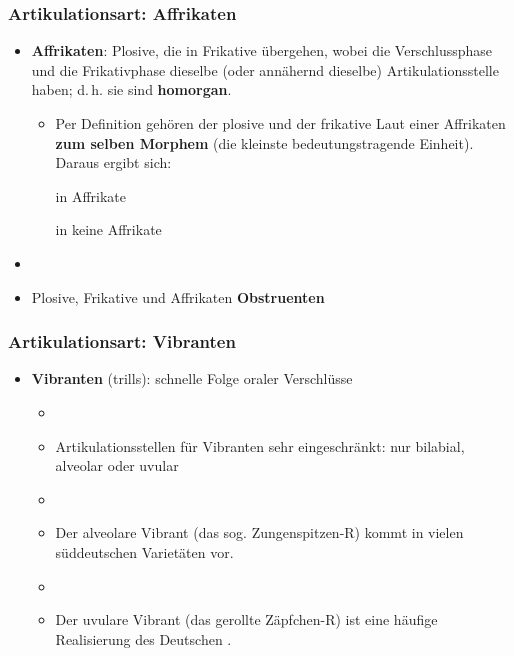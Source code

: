 \begin{frame}
\frametitle{Artikulationsart: Affrikaten}

		\begin{itemize}
			\item \textbf{Affrikaten}: Plosive, die in Frikative übergehen, wobei die Verschlussphase und die Frikativphase dieselbe (oder annähernd dieselbe) Artikulationsstelle haben; d.\,h. sie sind \textbf{homorgan}.

			\ea \textipa{[ \t{pf} , \t{ts} , \t{tS} , \t{dZ} ]}
			\z

			\begin{itemize}
				\item Per Definition gehören der plosive und der frikative Laut einer Affrikaten \textbf{zum selben Morphem} (die kleinste bedeutungstragende Einheit). Daraus ergibt sich:

				\ea \textipa{[ \t{ts} ]} in  \ras Affrikate
				\z
				
				\ea \textipa{[ ts ]} in  \ras keine Affrikate
				\z

			\end{itemize}
		
		\item[]
		\item Plosive, Frikative und Affrikaten \ras \textbf{Obstruenten}
	\end{itemize}
	
\end{frame}


\begin{frame}
\frametitle{Artikulationsart: Vibranten}

		\begin{itemize}
			\item \textbf{Vibranten} (trills): schnelle Folge oraler Verschlüsse
			\begin{itemize}
				\item[]
				\item Artikulationsstellen für Vibranten sehr eingeschränkt: nur bilabial, alveolar oder uvular
				\item[]
				\item Der alveolare Vibrant \textipa{[ r ]} (das sog. Zungenspitzen-R) kommt in vielen süddeutschen Varietäten vor.
				\item[]
				\item Der uvulare Vibrant \textipa{[ \textscr\ ]} (das gerollte Zäpfchen-R) ist eine häufige Realisierung des Deutschen .
			\end{itemize}
			 
	\end{itemize}
	
\end{frame}


